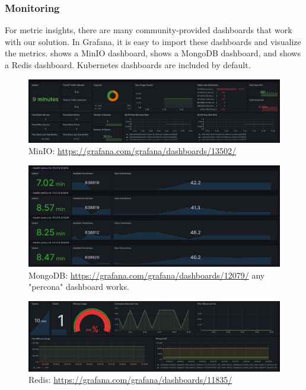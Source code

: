 \documentclass{report}
\begin{document}
    \subsubsection{Monitoring}
    For metric insights, there are many community-provided dashboards that work with our solution. In Grafana, it is easy to import these dashboards and visualize the metrics.  shows a MinIO dashboard,  shows a MongoDB dashboard, and  shows a Redis dashboard. Kubernetes dashboards are included by default.
    \begin{figure}[h]
        \centering
        \includegraphics[width=\textwidth]{images/dashboard-minio}
        \caption{MinIO: \url{https://grafana.com/grafana/dashboards/13502/}}
        \label{fig:dashboard-minio}
    \end{figure}
    \begin{figure}[h]
        \centering
        \includegraphics[width=\textwidth]{images/dashboard-mongodb}
        \caption{MongoDB: \url{https://grafana.com/grafana/dashboards/12079/} any "percona" dashboard works.}
        \label{fig:dashboard-mongodb}
    \end{figure}
    \begin{figure}[h]
        \centering
        \includegraphics[width=\textwidth]{images/dashboard-redis}
        \caption{Redis: \url{https://grafana.com/grafana/dashboards/11835/}}
        \label{fig:dashboard-redis}
    \end{figure}
\end{document}
